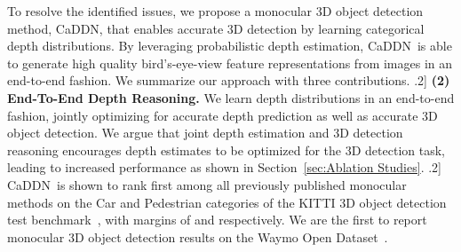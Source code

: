 \documentclass[final]{cvpr}
\newcommand{\method}{CaDDN}
\begin{document}
To resolve the identified issues, we propose a monocular 3D object detection method, \method, that enables accurate 3D detection by learning categorical depth distributions. By leveraging probabilistic depth estimation, \method~is able to generate high quality bird's-eye-view feature representations from images in an end-to-end fashion. We summarize our approach with three contributions.
\0.2\baselineskip]
\noindent\textbf{(2) End-To-End Depth Reasoning.} We learn depth distributions in an end-to-end fashion, jointly optimizing for accurate depth prediction as well as accurate 3D object detection. We argue that joint depth estimation and 3D detection reasoning encourages depth estimates to be optimized for the 3D detection task, leading to increased performance as shown in Section~\ref{sec:Ablation Studies}.
\0.2\baselineskip]
\indent
\method~is shown to rank first among all previously published monocular methods on the Car and Pedestrian categories of the KITTI 3D object detection test benchmark~\cite{KITTI_Test}, with margins of  and   respectively. We are the first to report monocular 3D object detection results on the Waymo Open Dataset~\cite{waymo}.
\end{document}
